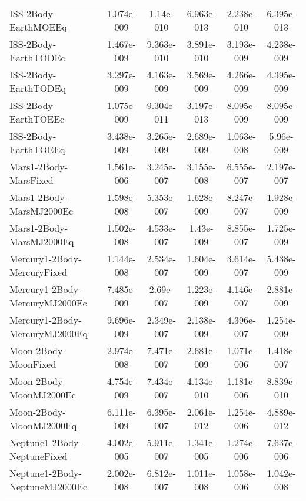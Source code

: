 \begin{table}[htbp!]
\begin{tabular}{lccccc}
         ISS-2Body-EarthMOEEq & 1.074e-009 & 1.14e-010 & 6.963e-013 & 2.238e-010 & 6.395e-013 \\
         ISS-2Body-EarthTODEc & 1.467e-009 & 9.363e-010 & 3.891e-010 & 3.193e-009 & 4.238e-009 \\
         ISS-2Body-EarthTODEq & 3.297e-009 & 4.163e-009 & 3.569e-009 & 4.266e-009 & 4.395e-009 \\
         ISS-2Body-EarthTOEEc & 1.075e-009 & 9.304e-011 & 3.197e-013 & 8.095e-009 & 8.095e-009 \\
         ISS-2Body-EarthTOEEq & 3.438e-009 & 3.265e-009 & 2.689e-009 & 1.063e-008 & 5.96e-009 \\
         Mars1-2Body-MarsFixed & 1.561e-006 & 3.245e-007 & 3.155e-008 & 6.555e-007 & 2.197e-007 \\
         Mars1-2Body-MarsMJ2000Ec & 1.598e-008 & 5.353e-007 & 1.628e-009 & 8.247e-007 & 1.928e-009 \\
         Mars1-2Body-MarsMJ2000Eq & 1.502e-008 & 4.533e-007 & 1.43e-009 & 8.855e-007 & 1.725e-009 \\
         Mercury1-2Body-MercuryFixed & 1.144e-008 & 2.534e-007 & 1.604e-009 & 3.614e-007 & 5.438e-009 \\
         Mercury1-2Body-MercuryMJ2000Ec & 7.485e-009 & 2.69e-007 & 1.223e-009 & 4.146e-007 & 2.881e-009 \\
         Mercury1-2Body-MercuryMJ2000Eq & 9.696e-009 & 2.349e-007 & 2.138e-009 & 4.396e-007 & 1.254e-009 \\
         Moon-2Body-MoonFixed & 2.974e-008 & 7.471e-007 & 2.681e-009 & 1.071e-006 & 1.418e-007 \\
         Moon-2Body-MoonMJ2000Ec & 4.754e-009 & 7.434e-007 & 4.134e-010 & 1.181e-006 & 8.839e-010 \\
         Moon-2Body-MoonMJ2000Eq & 6.111e-009 & 6.395e-007 & 2.061e-012 & 1.254e-006 & 4.889e-012 \\
         Neptune1-2Body-NeptuneFixed & 4.002e-005 & 5.911e-007 & 1.341e-005 & 1.274e-006 & 7.637e-006 \\
         Neptune1-2Body-NeptuneMJ2000Ec & 2.002e-008 & 6.812e-007 & 1.011e-008 & 1.058e-006 & 1.042e-008 \\

\end{tabular}
\end{table}
